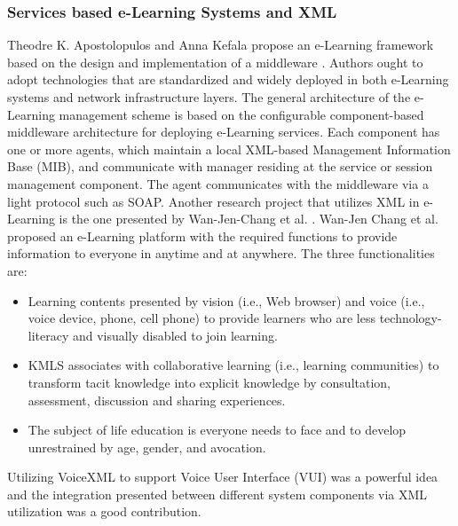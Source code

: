 \documentclass[12pt,a4paper,final,twoside,onecolumn,titlepage]{book}
\begin{document}
\subsubsection{Services based e-Learning Systems and XML}
Theodre K. Apostolopulos and Anna Kefala propose an e-Learning framework based on the design and implementation of a middleware \cite{R67}. Authors ought to adopt technologies that are standardized and widely deployed in both e-Learning systems and network infrastructure layers. The general architecture of the e-Learning management scheme is based on the configurable component-based middleware architecture for deploying e-Learning services. Each component has one or more agents, which maintain a local \gls{XML}-based Management Information Base (MIB), and communicate with manager residing at the service or session management component. The agent communicates with the middleware via a light protocol such as \gls{SOAP}.
Another research project that utilizes \gls{XML} in e-Learning is the one presented by Wan-Jen-Chang et al. \cite{R68}. Wan-Jen Chang et al. proposed an e-Learning platform with the required functions to provide information to everyone in anytime and at anywhere. The three functionalities are: 
\begin{itemize}
\item Learning contents presented by vision (i.e., Web browser) and voice (i.e., voice device, phone, cell phone) to provide learners who are less technology-literacy and visually disabled to join learning. 
\item KMLS associates with collaborative learning (i.e., learning communities) to transform tacit knowledge into explicit knowledge by consultation, assessment, discussion and sharing experiences. 
\item The subject of life education is everyone needs to face and to develop unrestrained by age, gender, and avocation. 
\end{itemize}
Utilizing Voice\gls{XML} to support Voice User Interface (VUI) was a powerful idea and the integration presented between different system components via \gls{XML} utilization was a good contribution.
\end{document}
